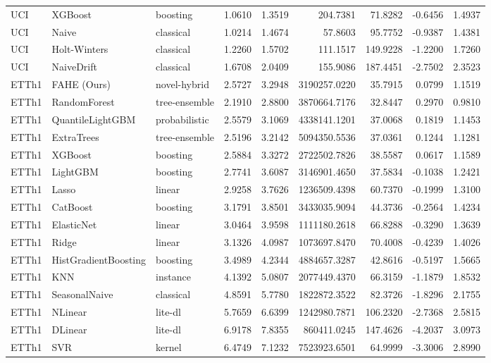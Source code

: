 \begin{tabular}{lllrrrrrr}
UCI & XGBoost & boosting & 1.0610 & 1.3519 & 204.7381 & 71.8282 & -0.6456 & 1.4937 \\
UCI & Naive & classical & 1.0214 & 1.4674 & 57.8603 & 95.7752 & -0.9387 & 1.4381 \\
UCI & Holt-Winters & classical & 1.2260 & 1.5702 & 111.1517 & 149.9228 & -1.2200 & 1.7260 \\
UCI & NaiveDrift & classical & 1.6708 & 2.0409 & 155.9086 & 187.4451 & -2.7502 & 2.3523 \\
ETTh1 & FAHE (Ours) & novel-hybrid & 2.5727 & 3.2948 & 3190257.0220 & 35.7915 & 0.0799 & 1.1519 \\
ETTh1 & RandomForest & tree-ensemble & 2.1910 & 2.8800 & 3870664.7176 & 32.8447 & 0.2970 & 0.9810 \\
ETTh1 & QuantileLightGBM & probabilistic & 2.5579 & 3.1069 & 4338141.1201 & 37.0068 & 0.1819 & 1.1453 \\
ETTh1 & ExtraTrees & tree-ensemble & 2.5196 & 3.2142 & 5094350.5536 & 37.0361 & 0.1244 & 1.1281 \\
ETTh1 & XGBoost & boosting & 2.5884 & 3.3272 & 2722502.7826 & 38.5587 & 0.0617 & 1.1589 \\
ETTh1 & LightGBM & boosting & 2.7741 & 3.6087 & 3146901.4650 & 37.5834 & -0.1038 & 1.2421 \\
ETTh1 & Lasso & linear & 2.9258 & 3.7626 & 1236509.4398 & 60.7370 & -0.1999 & 1.3100 \\
ETTh1 & CatBoost & boosting & 3.1791 & 3.8501 & 3433035.9094 & 44.3736 & -0.2564 & 1.4234 \\
ETTh1 & ElasticNet & linear & 3.0464 & 3.9598 & 1111180.2618 & 66.8288 & -0.3290 & 1.3639 \\
ETTh1 & Ridge & linear & 3.1326 & 4.0987 & 1073697.8470 & 70.4008 & -0.4239 & 1.4026 \\
ETTh1 & HistGradientBoosting & boosting & 3.4989 & 4.2344 & 4884657.3287 & 42.8616 & -0.5197 & 1.5665 \\
ETTh1 & KNN & instance & 4.1392 & 5.0807 & 2077449.4370 & 66.3159 & -1.1879 & 1.8532 \\
ETTh1 & SeasonalNaive & classical & 4.8591 & 5.7780 & 1822872.3522 & 82.3726 & -1.8296 & 2.1755 \\
ETTh1 & NLinear & lite-dl & 5.7659 & 6.6399 & 1242980.7871 & 106.2320 & -2.7368 & 2.5815 \\
ETTh1 & DLinear & lite-dl & 6.9178 & 7.8355 & 860411.0245 & 147.4626 & -4.2037 & 3.0973 \\
ETTh1 & SVR & kernel & 6.4749 & 7.1232 & 7523923.6501 & 64.9999 & -3.3006 & 2.8990 \\

\end{tabular}
